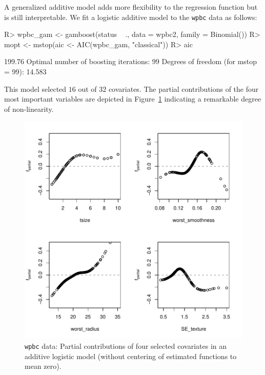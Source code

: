 \documentclass{article}
\newcommand{\Robject}[1]{\texttt{#1}}
\newenvironment{Schunk}{}{}
\begin{document}

A generalized additive model adds more flexibility to the regression function but is still
interpretable. We fit a logistic additive model to the \Robject{wpbc} data as follows:
\begin{Schunk}
\begin{Sinput}
R> wpbc_gam <- gamboost(status ~ ., data = wpbc2, 
         family = Binomial())
R> mopt <- mstop(aic <- AIC(wpbc_gam, "classical"))
R> aic
\end{Sinput}
\begin{Soutput}
[1] 199.76
Optimal number of boosting iterations: 99 
Degrees of freedom (for mstop = 99): 14.583 
\end{Soutput}
\end{Schunk}
This model selected $16$ out of $32$
covariates. The partial contributions of the four most important variables
are depicted in  
Figure~\ref{wpbc-gamboost-plot} indicating a remarkable degree of non-linearity.
\begin{figure}[t]
\begin{center}
\includegraphics{figures/BH-wpbc-gamboost-plot}
\caption{\Robject{wpbc} data: Partial contributions of four selected 
    covariates in an additive logistic model (without centering of
    estimated functions to mean zero).
    \label{wpbc-gamboost-plot}}
\end{center}
\end{figure}
\end{document}

